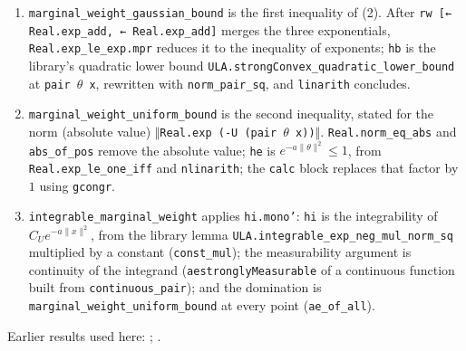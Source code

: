 \documentclass[11pt,a4paper]{article}
\begin{document}
\begin{leanbox}
\begin{enumerate}


\item \texttt{marginal\_\allowbreak{}weight\_\allowbreak{}gaussian\_\allowbreak{}bound} is the first inequality of (2). After \texttt{rw [← Real.\allowbreak{}exp\_\allowbreak{}add, ← Real.\allowbreak{}exp\_\allowbreak{}add]} merges the three exponentials, \texttt{Real.\allowbreak{}exp\_\allowbreak{}le\_\allowbreak{}exp.\allowbreak{}mpr} reduces it to the inequality of exponents; \texttt{hb} is the library's quadratic lower bound \texttt{ULA.\allowbreak{}strong\allowbreak{}Convex\_\allowbreak{}quadratic\_\allowbreak{}lower\_\allowbreak{}bound} at \texttt{pair \ensuremath{\theta} x}, rewritten with \texttt{norm\_\allowbreak{}pair\_\allowbreak{}sq}, and \texttt{linarith} concludes.

\item \texttt{marginal\_\allowbreak{}weight\_\allowbreak{}uniform\_\allowbreak{}bound} is the second inequality, stated for the norm (absolute value) \texttt{\ensuremath{\Vert}Real.\allowbreak{}exp (-\allowbreak{}U (pair \ensuremath{\theta} x))\ensuremath{\Vert}}. \texttt{Real.\allowbreak{}norm\_\allowbreak{}eq\_\allowbreak{}abs} and \texttt{abs\_\allowbreak{}of\_\allowbreak{}pos} remove the absolute value; \texttt{he} is \(e^{-a\|\theta\|^2}\le1\), from \texttt{Real.\allowbreak{}exp\_\allowbreak{}le\_\allowbreak{}one\_\allowbreak{}iff} and \texttt{nlinarith}; the \texttt{calc} block replaces that factor by \(1\) using \texttt{gcongr}.

\item \texttt{integrable\_\allowbreak{}marginal\_\allowbreak{}weight} applies \texttt{hi.\allowbreak{}mono'}: \texttt{hi} is the integrability of \(C_Ue^{-a\|x\|^2}\), from the library lemma \texttt{ULA.\allowbreak{}integrable\_\allowbreak{}exp\_\allowbreak{}neg\_\allowbreak{}mul\_\allowbreak{}norm\_\allowbreak{}sq} multiplied by a constant (\texttt{const\_\allowbreak{}mul}); the measurability argument is continuity of the integrand (\texttt{aestrongly\allowbreak{}Measurable} of a continuous function built from \texttt{continuous\_\allowbreak{}pair}); and the domination is \texttt{marginal\_\allowbreak{}weight\_\allowbreak{}uniform\_\allowbreak{}bound} at every point (\texttt{ae\_\allowbreak{}of\_\allowbreak{}all}).

\end{enumerate}
\end{leanbox}


Earlier results used here: \cite[Section~3.26.4]{LangevinLean2026ULASC}; \cite[Section~3.26.5]{LangevinLean2026ULASC}.
\end{document}
